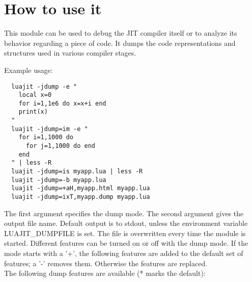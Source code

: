 

\section{How to use it}
\label{Sec:dump-usage}

This module can be used to debug the JIT compiler itself or to analyze its
behavior regarding a piece of code. It dumps the
code representations and structures used in various compiler stages.

Example usage:
\begin{lstlisting}
  luajit -jdump -e "
    local x=0
    for i=1,1e6 do x=x+i end
    print(x)
  "
  luajit -jdump=im -e "
    for i=1,1000 do
      for j=1,1000 do end
    end
  " | less -R
  luajit -jdump=is myapp.lua | less -R
  luajit -jdump=-b myapp.lua
  luajit -jdump=+aH,myapp.html myapp.lua
  luajit -jdump=ixT,myapp.dump myapp.lua
\end{lstlisting}
The first argument specifies the dump mode. The second argument gives
the output file name. Default output is to stdout, unless the environment
variable LUAJIT\_DUMPFILE is set. The file is overwritten every time the
module is started. Different features can be turned on or off with the dump mode.
If the mode starts with a '+', the following features are added to the default
set of features; a '-' removes them. Otherwise the features are replaced.\\
The following dump features are available (* marks the default):

